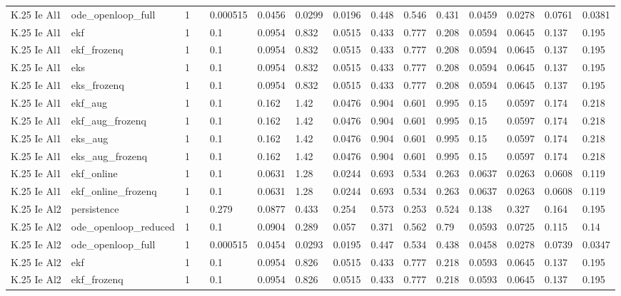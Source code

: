 \begin{table}[t]
\begin{tabular}{lllllllllllllll}
K.25 Ie Al1 & ode\_openloop\_full & 1 &  & 0.000515 & 0.0456 & 0.0299 & 0.0196 & 0.448 & 0.546 & 0.431 & 0.0459 & 0.0278 & 0.0761 & 0.0381 \\
K.25 Ie Al1 & ekf & 1 &  & 0.1 & 0.0954 & 0.832 & 0.0515 & 0.433 & 0.777 & 0.208 & 0.0594 & 0.0645 & 0.137 & 0.195 \\
K.25 Ie Al1 & ekf\_frozenq & 1 &  & 0.1 & 0.0954 & 0.832 & 0.0515 & 0.433 & 0.777 & 0.208 & 0.0594 & 0.0645 & 0.137 & 0.195 \\
K.25 Ie Al1 & eks & 1 &  & 0.1 & 0.0954 & 0.832 & 0.0515 & 0.433 & 0.777 & 0.208 & 0.0594 & 0.0645 & 0.137 & 0.195 \\
K.25 Ie Al1 & eks\_frozenq & 1 &  & 0.1 & 0.0954 & 0.832 & 0.0515 & 0.433 & 0.777 & 0.208 & 0.0594 & 0.0645 & 0.137 & 0.195 \\
K.25 Ie Al1 & ekf\_aug & 1 &  & 0.1 & 0.162 & 1.42 & 0.0476 & 0.904 & 0.601 & 0.995 & 0.15 & 0.0597 & 0.174 & 0.218 \\
K.25 Ie Al1 & ekf\_aug\_frozenq & 1 &  & 0.1 & 0.162 & 1.42 & 0.0476 & 0.904 & 0.601 & 0.995 & 0.15 & 0.0597 & 0.174 & 0.218 \\
K.25 Ie Al1 & eks\_aug & 1 &  & 0.1 & 0.162 & 1.42 & 0.0476 & 0.904 & 0.601 & 0.995 & 0.15 & 0.0597 & 0.174 & 0.218 \\
K.25 Ie Al1 & eks\_aug\_frozenq & 1 &  & 0.1 & 0.162 & 1.42 & 0.0476 & 0.904 & 0.601 & 0.995 & 0.15 & 0.0597 & 0.174 & 0.218 \\
K.25 Ie Al1 & ekf\_online & 1 &  & 0.1 & 0.0631 & 1.28 & 0.0244 & 0.693 & 0.534 & 0.263 & 0.0637 & 0.0263 & 0.0608 & 0.119 \\
K.25 Ie Al1 & ekf\_online\_frozenq & 1 &  & 0.1 & 0.0631 & 1.28 & 0.0244 & 0.693 & 0.534 & 0.263 & 0.0637 & 0.0263 & 0.0608 & 0.119 \\
K.25 Ie Al2 & persistence & 1 &  & 0.279 & 0.0877 & 0.433 & 0.254 & 0.573 & 0.253 & 0.524 & 0.138 & 0.327 & 0.164 & 0.195 \\
K.25 Ie Al2 & ode\_openloop\_reduced & 1 &  & 0.1 & 0.0904 & 0.289 & 0.057 & 0.371 & 0.562 & 0.79 & 0.0593 & 0.0725 & 0.115 & 0.14 \\
K.25 Ie Al2 & ode\_openloop\_full & 1 &  & 0.000515 & 0.0454 & 0.0293 & 0.0195 & 0.447 & 0.534 & 0.438 & 0.0458 & 0.0278 & 0.0739 & 0.0347 \\
K.25 Ie Al2 & ekf & 1 &  & 0.1 & 0.0954 & 0.826 & 0.0515 & 0.433 & 0.777 & 0.218 & 0.0593 & 0.0645 & 0.137 & 0.195 \\
K.25 Ie Al2 & ekf\_frozenq & 1 &  & 0.1 & 0.0954 & 0.826 & 0.0515 & 0.433 & 0.777 & 0.218 & 0.0593 & 0.0645 & 0.137 & 0.195 \\

\end{tabular}
\end{table}
